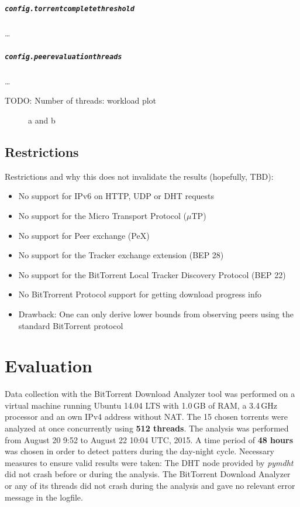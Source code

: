 \documentclass[10pt, a4paper, twoside, headsepline]{scrbook}
\renewcommand{\_}{\origunderscore\allowbreak}
\newcommand{\config}[1]{\texttt{config.\allowbreak #1}}
\newcommand{\range}{from August 20 9:52 to August 22 10:04 UTC, 2015} %
\begin{document}
\paragraph{\config{torrent\_complete\_threshold}}
\dots

\paragraph{\config{peer\_evaluation\_threads}}
\dots

TODO: Number of threads: workload plot

\begin{figure}
\centering
\caption[Load parameters during the analysis]{a and b}
\label{load}
\end{figure}

\section{Restrictions}

Restrictions and why this does not invalidate the results (hopefully, TBD):

\begin{itemize}
  \item No support for IPv6 on HTTP, UDP or DHT requests
  \item No support for the Micro Transport Protocol ($\mu$TP)
  \item No support for Peer exchange (PeX)
  \item No support for the Tracker exchange extension (BEP 28)
  \item No support for the BitTorrent Local Tracker Discovery Protocol (BEP 22)
  \item No BitTrorrent Protocol support for getting download progress info
  \item Drawback: One can only derive lower bounds from observing peers using the standard BitTorrent protocol
\end{itemize}

\chapter{Evaluation}
Data collection with the BitTorrent Download Analyzer tool was performed on a virtual machine running Ubuntu 14.04 LTS with 1.0\,GB of RAM, a 3.4\,GHz processor and an own IPv4 address without NAT. The 15 chosen torrents were analyzed at once concurrently using \textbf{512 threads}. The analysis was performed \range. A time period of \textbf{48 hours} was chosen in order to detect patters during the day-night cycle. Necessary measures to ensure valid results were taken: The DHT node provided by \emph{pymdht} did not crash before or during the analysis. The BitTorrent Download Analyzer or any of its threads did not crash during the analysis and gave no relevant error message in the logfile.
\end{document}
